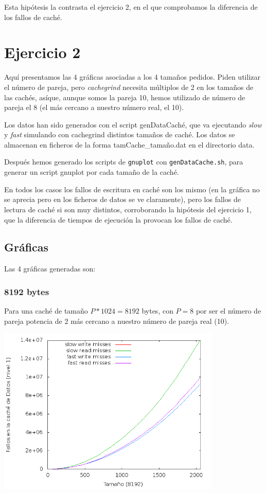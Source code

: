 \documentclass[nochap]{apuntes}
\begin{document}
Esta hipótesis la contrasta el ejercicio 2, en el que comprobamos la diferencia de los fallos de caché.

\section*{Ejercicio 2}

Aquí presentamos las 4 gráficas asociadas a los 4 tamaños pedidos. Piden utilizar el número de pareja, pero \emph{cachegrind} necesita múltiplos de 2 en los tamaños de las cachés, asíque, aunque somos la pareja 10, hemos utilizado de número de pareja el 8 (el más cercano a nuestro número real, el 10).

Los datos han sido generados con el script genDataCaché, que va ejecutando \emph{slow} y \emph{fast} simulando con cachegrind distintos tamaños de caché. Los datos se almacenan en ficheros de la forma tamCache\_tamaño.dat en el directorio data. 

Después hemos generado los scripts de \texttt{gnuplot} con \texttt{genDataCache.sh}, para generar un script gnuplot por cada tamaño de la caché.

En todos los casos los fallos de escritura en caché son los mismo (en la gráfica no se aprecia pero en los ficheros de datos se ve claramente), pero los fallos de lectura de caché si son muy distintos, corroborando la hipótesis del ejercicio 1, que la diferencia de tiempos de ejecución la provocan los fallos de caché.

\subsection*{Gr\'aficas}
Las 4 gráficas generadas son:

\subsubsection*{8192 bytes}
Para una caché de tamaño $P*1024 = 8192$ bytes, con $P=8$ por ser el número de pareja potencia de 2 más cercano a nuestro número de pareja real (10).

\begin{center}
\includegraphics[width=0.8\textwidth]{graficas/fotos/Cache_8192.png}
\end{center}
\end{document}
